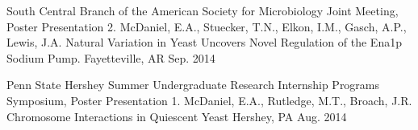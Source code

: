 \begin{cventries}
{    }
  \cventry
    {South Central Branch of the American Society for Microbiology Joint Meeting, Poster Presentation} %
    {2. McDaniel, E.A., Stuecker, T.N., Elkon, I.M., Gasch, A.P., Lewis, J.A. Natural Variation
in Yeast Uncovers Novel Regulation of the Ena1p Sodium Pump.} %
    {Fayetteville, AR} %
    {Sep. 2014} %
    {
      \begin{cvitems} %
      \end{cvitems}
    }
  \cventry
    {Penn State Hershey Summer Undergraduate Research Internship Programs Symposium, Poster Presentation} %
    {1. McDaniel, E.A., Rutledge, M.T., Broach, J.R. Chromosome Interactions in Quiescent Yeast} %
    {Hershey, PA} %
    {Aug. 2014} %
    {
      \begin{cvitems} %
      \end{cvitems}
    }
\end{cventries}
